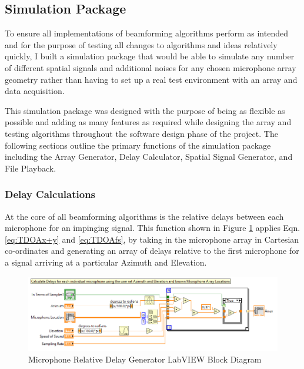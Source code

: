 \documentclass{UoNMCHA}
\numberwithin{equation}{section}
\begin{document}
\subsection{Simulation Package} \label{sec:Software Sim}
    
    To ensure all implementations of beamforming algorithms perform as intended and for the purpose of testing all changes to algorithms and ideas relatively quickly, I built a simulation package that would be able to simulate any number of different spatial signals and additional noises for any chosen microphone array geometry rather than having to set up a real test environment with an array and data acquisition.
    
    This simulation package was designed with the purpose of being as flexible as possible and adding as many features as required while designing the array and testing algorithms throughout the software design phase of the project. The following sections outline the primary functions of the simulation package including the Array Generator, Delay Calculator, Spatial Signal Generator, and File Playback.
    
\subsubsection{Delay Calculations} \label{sec:Delay Calculations}
    At the core of all beamforming algorithms is the relative delays between each microphone for an impinging signal. This function shown in Figure \ref{fig:MicDelayBlock} applies Eqn. \ref{eq:TDOAx+y} and \ref{eq:TDOAfs}, by taking in the microphone array in Cartesian co-ordinates and generating an array of delays relative to the first microphone for a signal arriving at a particular Azimuth and Elevation.
    
    \begin{figure}[H]
        \centering
        \includegraphics[keepaspectratio, width = \textwidth]{Figures/DelayCalcBlock.png}
        \caption{Microphone Relative Delay Generator LabVIEW Block Diagram}
        \label{fig:MicDelayBlock}
    \end{figure}    
    
\end{document}
